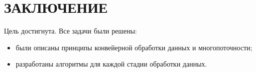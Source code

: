 \chapter*{\centering ЗАКЛЮЧЕНИЕ}

Цель достигнута. Все задачи были решены:
\begin{itemize}[label=---]
	\item были описаны принципы конвейерной обработки данных и многопоточности;
	\item разработаны алгоритмы для каждой стадии обработки данных.
\end{itemize}
